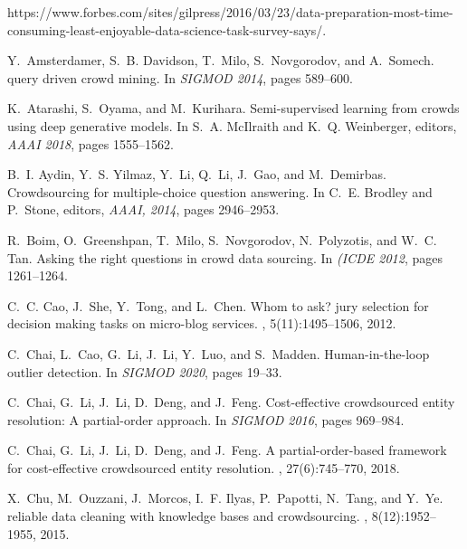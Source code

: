 \documentclass[11pt]{article}
\begin{document}
\begin{thebibliography}{10}
	
	https://www.forbes.com/sites/gilpress/2016/03/23/data-preparation-most-time-consuming-least-enjoyable-data-science-task-survey-says/.
	
	Y.~Amsterdamer, S.~B. Davidson, T.~Milo, S.~Novgorodov, and A.~Somech.
	 query driven crowd mining.
	\newblock In {\em {SIGMOD} 2014}, pages 589--600.
	
	K.~Atarashi, S.~Oyama, and M.~Kurihara.
	\newblock Semi-supervised learning from crowds using deep generative models.
	\newblock In S.~A. McIlraith and K.~Q. Weinberger, editors, {\em AAAI 2018},
	pages 1555--1562.
	
	B.~I. Aydin, Y.~S. Yilmaz, Y.~Li, Q.~Li, J.~Gao, and M.~Demirbas.
	\newblock Crowdsourcing for multiple-choice question answering.
	\newblock In C.~E. Brodley and P.~Stone, editors, {\em AAAI, 2014}, pages
	2946--2953.
	
	R.~Boim, O.~Greenshpan, T.~Milo, S.~Novgorodov, N.~Polyzotis, and W.~C. Tan.
	\newblock Asking the right questions in crowd data sourcing.
	\newblock In {\em {(ICDE} 2012}, pages 1261--1264.
	
	C.~C. Cao, J.~She, Y.~Tong, and L.~Chen.
	\newblock Whom to ask? jury selection for decision making tasks on micro-blog
	services.
	, 5(11):1495--1506, 2012.
	
	C.~Chai, L.~Cao, G.~Li, J.~Li, Y.~Luo, and S.~Madden.
	\newblock Human-in-the-loop outlier detection.
	\newblock In {\em {SIGMOD} 2020}, pages 19--33.
	
	C.~Chai, G.~Li, J.~Li, D.~Deng, and J.~Feng.
	\newblock Cost-effective crowdsourced entity resolution: {A} partial-order
	approach.
	\newblock In {\em {SIGMOD} 2016}, pages 969--984.
	
	C.~Chai, G.~Li, J.~Li, D.~Deng, and J.~Feng.
	\newblock A partial-order-based framework for cost-effective crowdsourced
	entity resolution.
	, 27(6):745--770, 2018.
	
	X.~Chu, M.~Ouzzani, J.~Morcos, I.~F. Ilyas, P.~Papotti, N.~Tang, and Y.~Ye.
	 reliable data cleaning with knowledge bases and
	crowdsourcing.
	, 8(12):1952--1955, 2015.
	

\end{thebibliography}
\end{document}

